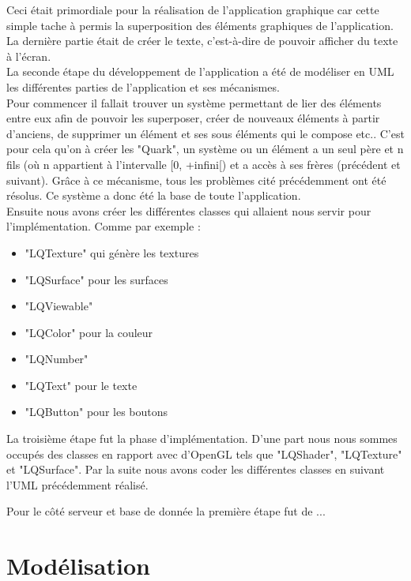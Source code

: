 \documentclass{report}
\begin{document}
Ceci était primordiale pour la réalisation de l'application graphique car cette simple tache à permis la superposition des éléments graphiques de l'application. \\
La dernière partie était de créer le texte, c'est-à-dire de pouvoir afficher du texte à l'écran. \\

La seconde étape du développement de l'application a été de modéliser en UML les différentes parties de l'application et ses mécanismes. \\
Pour commencer il fallait trouver un système permettant de lier des éléments entre eux afin de pouvoir les superposer, créer de nouveaux éléments à partir d'anciens, de supprimer un élément et ses sous éléments qui le compose etc..
C'est pour cela qu'on à créer les "Quark", un système ou un élément a un seul père et n fils (où n appartient à l'intervalle [0, +infini[) et a accès à ses frères (précédent et suivant). Grâce à ce mécanisme, tous les problèmes cité précédemment ont été résolus. Ce système a donc été la base de toute l'application. \\
Ensuite nous avons créer les différentes classes qui allaient nous servir pour l'implémentation. Comme par exemple : 
\begin{itemize}
    \item "LQTexture" qui génère les textures
    \item "LQSurface" pour les surfaces
    \item "LQViewable" 
    \item "LQColor" pour la couleur
    \item "LQNumber" 
    \item "LQText" pour le texte
    \item "LQButton" pour les boutons 
\end{itemize}

La troisième étape fut la phase d'implémentation. D'une part nous nous sommes occupés des classes en rapport avec d'OpenGL tels que "LQShader", "LQTexture" et "LQSurface".
Par la suite nous avons coder les différentes classes en suivant l'UML précédemment réalisé.

Pour le côté serveur et base de donnée la première étape fut de ...

\section{Modélisation} %
\end{document}
